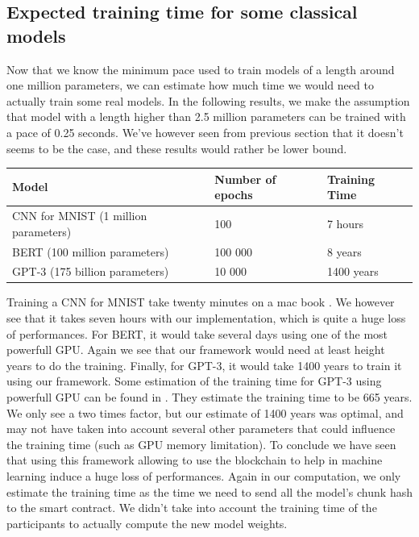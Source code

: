 \documentclass{article}
\begin{document}
\subsection{Expected training time for some classical models}
Now that we know the minimum pace used to train models of a length around one million parameters, we can estimate
how much time we would need to actually train some real models. In the following results, we make the
assumption that model with a length higher than 2.5 million parameters can be trained with a pace of 0.25 seconds. We've
however seen from previous section that it doesn't seems to be the case, and these results would rather be lower bound.
\begin{longtable}{|l|l|l|}
    \hline
    Model                                & Number of epochs & Training Time \\ \hline
    \endfirsthead
    \endhead
    CNN for MNIST (1 million parameters) & 100              & 7 hours       \\ \hline
    BERT (100 million parameters)        & 100 000          & 8 years       \\ \hline
    GPT-3 (175 billion parameters)       & 10 000           & 1400 years    \\ \hline
\end{longtable}
Training a CNN for MNIST take twenty minutes\cite{MNIST_runtime} on a mac book . We however see that it takes seven hours
with our implementation, which is quite a huge loss of performances. For BERT, it would take several days \cite{BERT_runtime} using one of the
most powerfull GPU. Again we see that our framework would need at least height years to do the training. Finally, for GPT-3,
it would take 1400 years to train it using our framework. Some estimation of the training time for GPT-3 using powerfull
GPU can be found in \cite{GPT_runtime}. They estimate the training time to be 665 years. We only see a two times
factor, but our estimate of 1400 years was optimal, and may not have taken into account several other parameters that could influence
the training time (such as GPU memory limitation). To conclude we have seen that using this framework allowing to use the
blockchain to help in machine learning induce a huge loss of performances. Again in our computation, we only estimate the
training time as the time we need to send all the model's chunk hash to the smart contract. We didn't take into account
the training time of the participants to actually compute the new model weights.
\newpage
\end{document}
